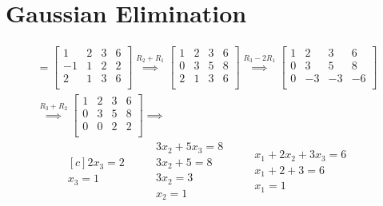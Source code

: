 \documentclass[12pt, a4paper]{article}
\begin{document}
\section{Gaussian Elimination}
\begin{gather*}
  [A \; | \; b] = 
  \left[ \begin{array}{ccc|c}
    1 & 2 & 3 & 6\\
    -1 & 1 & 2 & 2\\
    2 & 1 & 3 & 6\\
  \end{array} \right] 
  \overset{R_2 + R_1}{\implies} 
  \left[ \begin{array}{ccc|c}
    1 & 2 & 3 & 6\\
    0 & 3 & 5 & 8\\
    2 & 1 & 3 & 6\\
  \end{array} \right] 
  \overset{R_3 - 2R_1}{\implies} 
  \left[ \begin{array}{ccc|c}
    1 & 2 & 3 & 6\\
    0 & 3 & 5 & 8\\
    0 & -3 & -3 & -6\\
  \end{array} \right] \\[5pt]
  \overset{R_3 + R_2}{\implies} 
  \left[ \begin{array}{ccc|c}
    1 & 2 & 3 & 6\\
    0 & 3 & 5 & 8\\
    0 & 0 & 2 & 2\\
  \end{array} \right] \implies
\end{gather*}
\begin{equation*}
  \begin{aligned}[c]
    2x_3 = 2 \\ 
    x_3 = 1
  \end{aligned}
  \qquad
  \begin{aligned}
    3x_2 + 5x_3 = 8 \\
    3x_2 + 5 = 8 \\
    3x_2 = 3 \\
    x_2 = 1
  \end{aligned}
  \qquad
  \begin{aligned}
    x_1 + 2x_2 + 3x_3 = 6 \\
    x_1 + 2 + 3 = 6 \\
    x_1 = 1
  \end{aligned}
\end{equation*}
\end{document}
